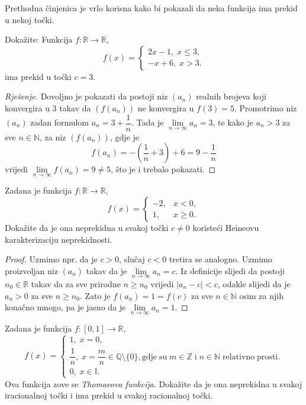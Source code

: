 Prethodna činjenica je vrlo korisna kako bi pokazali da neka funkcija ima prekid u nekoj točki.
\begin{exercise} Dokažite: Funkcija $f : \mathbb{R}\to \mathbb{R}$, $$f(x)=\begin{cases}
2x-1,\; x\leq 3,\\
-x+6,\; x>3.
\end{cases}$$
ima prekid u točki $c=3$.
\end{exercise}
\begin{proof}[Rješenje]
Dovoljno je pokazati da postoji niz $(a_n)$ realnih brojeva koji konvergira u $3$ takav da $\left(f(a_n)\right)$ ne konvergira u $f(3)=5$. Promotrimo niz $(a_n)$ zadan formulom $a_n=3+\dfrac{1}{n}$. Tada je $\lim\limits_{n\to \infty}{a_n}=3$, te kako je $a_n>3$ za sve $n\in \mathbb{N}$, za niz $\left(f(a_n)\right)$, gdje je
$$f(a_n)=-\left(\dfrac{1}{n}+3\right)+6=9-\dfrac{1}{n}$$
vrijedi $\lim\limits_{n\to \infty}{f(a_n)}=9\neq 5$, što je i trebalo pokazati.
\end{proof}
\begin{exercise}
Zadana je funkcija $f : \mathbb{R}\to \mathbb{R}$,
$$f(x)=\begin{cases}
-2, & x<0,\\
1, & x\geq 0.
\end{cases}$$
Dokažite da je ona neprekidna u svakoj točki $c\neq 0$ koristeći Heineovu karakterizaciju neprekidnosti.
\end{exercise}
\begin{proof}
Uzmimo npr. da je $c>0$, slučaj $c<0$ tretira se analogno. Uzmimo proizvoljan niz $(a_n)$ takav da je $\lim\limits_{n\to \infty}{a_n}=c$. Iz definicije slijedi da postoji $n_0\in \mathbb{R}$ takav da za sve prirodne $n\geq n_0$ vrijedi $|a_n-c|<c$, odakle slijedi da je $a_n>0$ za sve $n\geq n_0$. Zato je $f(a_n)=1=f(c)$ za sve $n\in \mathbb{N}$ osim za njih konačno mnogo, pa je jasno da je $\lim\limits_{n\to \infty}{a_n}=1$.
\end{proof}
\begin{exercise}
Zadana je funkcija $f : [0, 1]\to \mathbb{R}$, $$f(x)=\begin{cases}
1, \; x=0,\\
\dfrac{1}{n},\; x=\dfrac{m}{n}\in \mathbb{Q}\setminus\{0\},\mathrm{gdje\;su\;}m\in \mathbb{Z}\mathrm{\;i\;}n\in \mathbb{N}\mathrm{\;relativno\;prosti.}\\
0,\; x\in \mathbb{I}.
\end{cases}$$
Ova funkcija zove se \textit{Thomaeova funkcija}. Dokažite da je ona neprekidna u svakoj iracionalnoj točki i ima prekid u svakoj racionalnoj točki.
\end{exercise}
